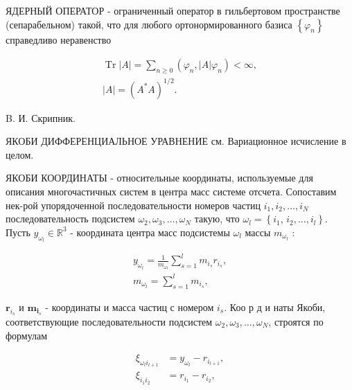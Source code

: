 \documentclass[10pt]{article}
\begin{document}
ЯДЕРНЫЙ ОПЕРАТОР - ограниченный оператор в гильбертовом пространстве (сепарабельном) такой, что для любого ортонормированного базиса $\left\{\varphi_{n}\right\}$ справедливо неравенство



\[

\begin{gathered}

\operatorname{Tr}|A|=\sum_{n \geqslant 0}\left(\varphi_{n},|A| \varphi_{n}\right)<\infty, \\

|A|=\left(A^{*} A\right)^{1 / 2} .

\end{gathered}

\]



B. И. Скрипник.



ЯКОБИ ДИФФЕРЕНЦИАЛЬНОЕ УРАВНЕНИЕ см. Вариационное исчисление в целом.



ЯКОБИ КООРДИНАТЫ - относительные координаты, используемые для описания многочастичных систем в центра масс системе отсчета. Сопоставим нек-рой упорядоченной последовательности номеров частиц $i_{1}, i_{2}, \ldots, i_{N}$ последовательность подсистем $\omega_{2}, \omega_{3}, \ldots, \omega_{N}$ такую, что $\omega_{l}=\left\{i_{1}\right.$, $\left.i_{2}, \ldots, i_{l}\right\}$. Пусть $y_{\omega_{l}} \in \mathbb{R}^{3}$ - координата центра масс подсистемы $\omega_{l}$ массы $m_{\omega_{l}}$ :



\[

\begin{gathered}

y_{\omega_{l}}=\frac{1}{m_{\omega_{l}}} \sum_{s=1}^{l} m_{i_{s}} r_{i_{s}}, \\

m_{\omega_{l}}=\sum_{s=1}^{l} m_{i_{s}},

\end{gathered}

\]



$\boldsymbol{r}_{i_{s}}$ и $\boldsymbol{m}_{\boldsymbol{i}_{s}}$ - координаты и масса частиц с номером $i_{s}$. Коо р д и наты Якоби, соответствующие последовательности подсистем $\omega_{2}, \omega_{3}, \ldots, \omega_{N}$, строятся по формулам



\[

\begin{aligned}

\xi_{\omega_{l} i_{l+1}} & =y_{\omega_{l}}-r_{i_{l+1}}, \\

\xi_{i_{1} i_{2}} & =r_{i_{1}}-r_{i_{2}},

\end{aligned}

\]
\end{document}
